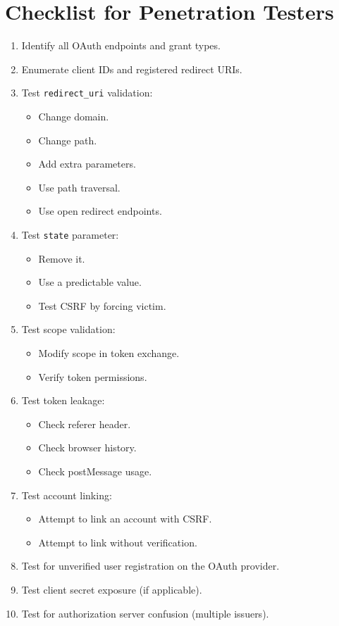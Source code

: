 \documentclass[12pt,a4paper]{article}
\begin{document}
\section{Checklist for Penetration Testers}
\begin{enumerate}
    \item Identify all OAuth endpoints and grant types.
    \item Enumerate client IDs and registered redirect URIs.
    \item Test \texttt{redirect\_uri} validation:
        \begin{itemize}
            \item Change domain.
            \item Change path.
            \item Add extra parameters.
            \item Use path traversal.
            \item Use open redirect endpoints.
        \end{itemize}
    \item Test \texttt{state} parameter:
        \begin{itemize}
            \item Remove it.
            \item Use a predictable value.
            \item Test CSRF by forcing victim.
        \end{itemize}
    \item Test scope validation:
        \begin{itemize}
            \item Modify scope in token exchange.
            \item Verify token permissions.
        \end{itemize}
    \item Test token leakage:
        \begin{itemize}
            \item Check referer header.
            \item Check browser history.
            \item Check postMessage usage.
        \end{itemize}
    \item Test account linking:
        \begin{itemize}
            \item Attempt to link an account with CSRF.
            \item Attempt to link without verification.
        \end{itemize}
    \item Test for unverified user registration on the OAuth provider.
    \item Test client secret exposure (if applicable).
    \item Test for authorization server confusion (multiple issuers).
\end{enumerate}
\end{document}
